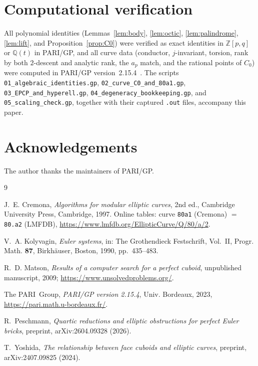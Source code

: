 \documentclass[11pt,reqno]{amsart}
\theoremstyle{plain}
\theoremstyle{definition}
\newcommand{\Q}{\mathbb{Q}}
\newcommand{\Z}{\mathbb{Z}}
\begin{document}
\section*{Computational verification}

All polynomial identities (Lemmas~\ref{lem:body}, \ref{lem:octic},
\ref{lem:palindrome}, \ref{lem:lift}, and Proposition~\ref{prop:C0}) were
verified as exact identities in $\Z[p,q]$ or $\Q(t)$ in PARI/GP, and all curve
data (conductor, $j$-invariant, torsion, rank by both $2$-descent and analytic
rank, the $a_p$ match, and the rational points of $C_0$) were computed in
PARI/GP version~2.15.4~\cite{pari}. The scripts
\texttt{01\_algebraic\_identities.gp},
\texttt{02\_curve\_C0\_and\_80a1.gp},
\texttt{03\_EPCP\_and\_hyperell.gp},
\texttt{04\_degeneracy\_bookkeeping.gp}, and
\texttt{05\_scaling\_check.gp}, together with their captured \texttt{.out}
files, accompany this paper.

\section*{Acknowledgements}
The author thanks the maintainers of PARI/GP.

\begin{thebibliography}{9}

J.~E. Cremona,
\emph{Algorithms for modular elliptic curves},
2nd ed., Cambridge University Press, Cambridge, 1997.
Online tables: curve \texttt{80a1} (Cremona) $=$ \texttt{80.a2} (LMFDB),
\url{https://www.lmfdb.org/EllipticCurve/Q/80/a/2}.

V.~A. Kolyvagin,
\emph{Euler systems},
in: The Grothendieck Festschrift, Vol.~II,
Progr. Math. \textbf{87}, Birkh\"auser, Boston, 1990, pp.~435--483.

R.~D. Matson,
\emph{Results of a computer search for a perfect cuboid},
unpublished manuscript, 2009;
\url{https://www.unsolvedproblems.org/}.

The PARI~Group,
\emph{PARI/GP version 2.15.4},
Univ. Bordeaux, 2023,
\url{https://pari.math.u-bordeaux.fr/}.

R.~Peschmann,
\emph{Quartic reductions and elliptic obstructions for perfect Euler bricks},
preprint, arXiv:2604.09328 (2026).

T.~Yoshida,
\emph{The relationship between face cuboids and elliptic curves},
preprint, arXiv:2407.09825 (2024).

\end{thebibliography}
\end{document}
